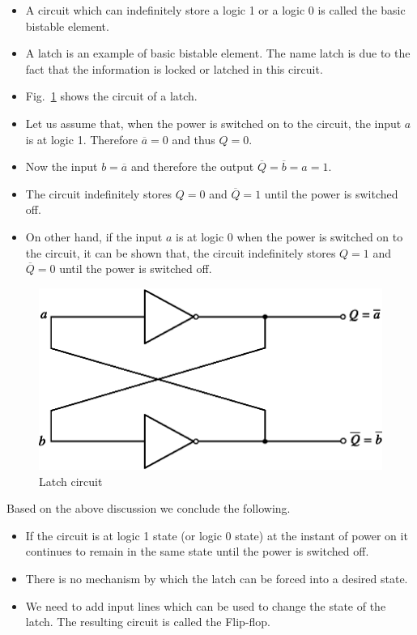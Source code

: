 \begin{itemize}
\item A circuit which can indefinitely store a logic 1 or a logic 0 is called the basic bistable element. 

\item A latch is an example of basic bistable element. The name latch is due to the fact that the information is locked or latched in this circuit.

\item Fig.~\ref{addfig6.37} shows the circuit of a latch.

\item Let us assume that, when the power is switched on to the circuit, the input $a$ is at logic 1. Therefore $\overline{a}=0$ and thus $Q=0$.

\item Now the input $b=\overline{a}$ and therefore the output $\overline{Q}=\overline{b}=a=1$.

\item The circuit indefinitely stores $Q=0$ and $\overline{Q}=1$ until the power is switched off.

\item On other hand, if the input $a$ is at logic 0 when the power is switched on to the circuit, it can be shown that, the circuit indefinitely stores $Q=1$ and $\overline{Q}=0$ until the power is switched off.
\end{itemize}
\begin{figure}[H]
\centering
\includegraphics[scale=.95]{chap6/fig137a.eps}
\medskip
\caption{Latch circuit}\label{addfig6.37}
\end{figure}


Based on the above discussion we conclude the following.
\begin{itemize}
\item If the circuit is at logic 1 state (or logic 0 state) at the instant of power on it continues to remain in the same state until the power is switched off.

\item There is no mechanism by which the latch can be forced into a desired state.

\item We need to add input lines which can be used to change the state of the latch. The resulting circuit is called the Flip-flop.
\end{itemize}

